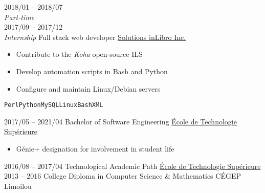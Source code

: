 \documentclass[9pt]{developercv} %
\begin{document}
\begin{minipage}[t]{0.8\textwidth}
\begin{entrylist}
{		}
	\entry
		{2018/01 -- 2018/07\\{\small\emph{Part-time}}\\2017/09 -- 2017/12\\{\small\emph{Internship}}}
		{Full stack web developer}
		{\href{https://inlibro.com/en/}{Solutions inLibro Inc.}}
		{
			\vspace{-14pt}
			\begin{itemize}
				\renewcommand{\labelitemi}{\raisebox{.45ex}{\rule{.6ex}{.6ex}}}
				\setlength\itemsep{-1pt}
				\item Contribute to the \emph{Koha} open-source ILS
				\item Develop automation scripts in Bash and Python
				\item Configure and maintain Linux/Debian servers
			\end{itemize}
			\vspace{-4pt}
			\texttt{Perl}\slashsep\texttt{Python}\slashsep\texttt{MySQL}\slashsep\texttt{Linux}\slashsep\texttt{Bash}\slashsep\texttt{XML}
		}
\end{entrylist}



\begin{entrylist}
	\setlength\itemsep{-1pt}
	\entry
		{2017/05 -- 2021/04}
		{Bachelor of Software Engineering}
		{\href{https://etsmtl.ca}{École de Technologie Supérieure}}
		{
			\vspace{-14pt}
			\begin{itemize}
				\renewcommand{\labelitemi}{\raisebox{.45ex}{\rule{.6ex}{.6ex}}}
				\setlength\itemsep{-1pt}
				\item Génie+ designation for involvement in student life
			\end{itemize}
			\vspace{-8pt}
		}
	\entry
		{2016/08 -- 2017/04}
		{Technological Academic Path}
		{\href{https://etsmtl.ca}{École de Technologie Supérieure}}
		{\vspace{-14pt}}
	\entry
		{2013 -- 2016}
		{College Diploma in Computer Science \& Mathematics}
		{CÉGEP Limoilou}
		{\vspace{-14pt}}
\end{entrylist}



\end{minipage}
\end{document}
